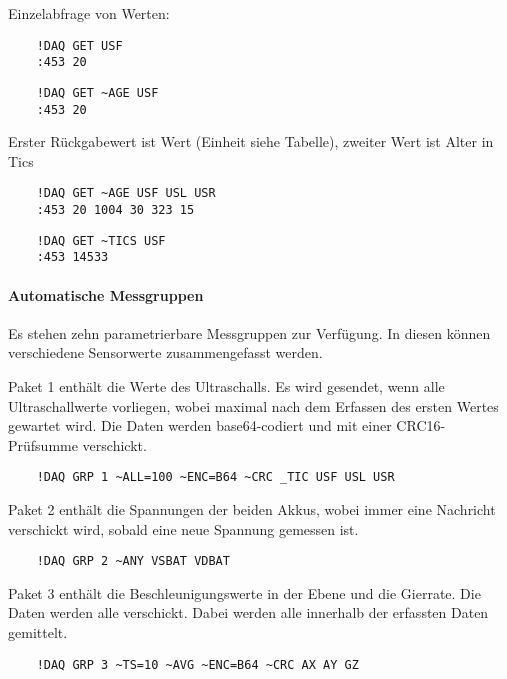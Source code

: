 Einzelabfrage von Werten:
\begin{verbatim}
	!DAQ GET USF
	:453 20
\end{verbatim}


\begin{verbatim}
	!DAQ GET ~AGE USF
	:453 20
\end{verbatim}

Erster Rückgabewert ist Wert (Einheit siehe Tabelle), zweiter Wert ist Alter in Tics

\begin{verbatim}
	!DAQ GET ~AGE USF USL USR
	:453 20 1004 30 323 15
\end{verbatim}



\begin{verbatim}
	!DAQ GET ~TICS USF
	:453 14533
\end{verbatim}


\paragraph{Automatische Messgruppen}

Es stehen zehn parametrierbare Messgruppen zur Verfügung. In diesen können verschiedene Sensorwerte zusammengefasst werden.

Paket 1 enthält die Werte des Ultraschalls. Es wird gesendet, wenn alle Ultraschallwerte vorliegen, wobei maximal  nach dem Erfassen des ersten Wertes gewartet wird. Die Daten werden base64-codiert und mit einer CRC16-Prüfsumme verschickt.
\begin{verbatim}
	!DAQ GRP 1 ~ALL=100 ~ENC=B64 ~CRC _TIC USF USL USR 
\end{verbatim}

Paket 2 enthält die Spannungen der beiden Akkus, wobei immer eine Nachricht verschickt wird, sobald eine neue Spannung gemessen ist.
\begin{verbatim}
	!DAQ GRP 2 ~ANY VSBAT VDBAT 
\end{verbatim}

Paket 3 enthält die Beschleunigungswerte in der Ebene und die Gierrate. Die Daten werden alle  verschickt. Dabei werden alle innerhalb der  erfassten Daten gemittelt.
\begin{verbatim}
	!DAQ GRP 3 ~TS=10 ~AVG ~ENC=B64 ~CRC AX AY GZ 
\end{verbatim}


